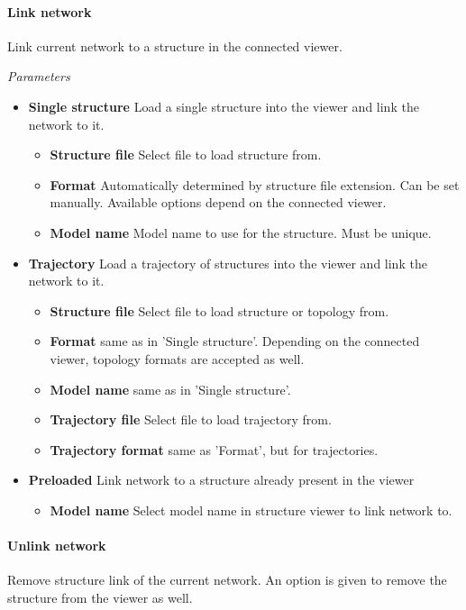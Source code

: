 \paragraph{Link network} Link current network to a structure in the connected viewer.

\textit{Parameters}
\begin{itemize}
\item \textbf{Single structure} Load a single structure into the viewer and link the network to it.
  \begin{itemize}
  \item \textbf{Structure file} Select file to load structure from.
  \item \textbf{Format} Automatically determined by structure file extension. Can be set manually. Available options depend on the connected viewer.
  \item \textbf{Model name} Model name to use for the structure. Must be unique.
  \end{itemize}
\item \textbf{Trajectory} Load a trajectory of structures into the viewer and link the network to it.
  \begin{itemize}
  \item \textbf{Structure file} Select file to load structure or topology from.
  \item \textbf{Format} same as in 'Single structure'. Depending on the connected viewer, topology formats are accepted as well.
  \item \textbf{Model name} same as in 'Single structure'.
  \item \textbf{Trajectory file} Select file to load trajectory from.
  \item \textbf{Trajectory format} same as 'Format', but for trajectories.
  \end{itemize}
\item \textbf{Preloaded} Link network to a structure already present in the viewer
  \begin{itemize}
  \item \textbf{Model name} Select model name in structure viewer to link network to.
  \end{itemize}
\end{itemize}

\paragraph{Unlink network} Remove structure link of the current network. An option is given to remove the structure from the viewer as well.

